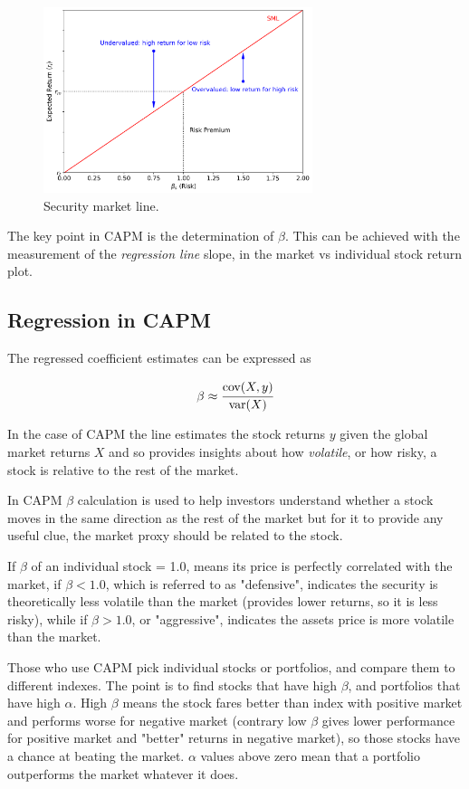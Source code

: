 \begin{figure}[htb]
	\centering
	\includegraphics[width=0.7\textwidth]{figures/sml}
	\caption{Security market line.}
	\label{fig:sml}
\end{figure}

The key point in CAPM is the determination of $\beta$. This can be achieved with the measurement of the \emph{regression line} slope, in the market vs individual stock return plot.

\subsection{Regression in CAPM}

The regressed coefficient estimates can be expressed as 

\begin{equation}
\beta \approx \cfrac{\textrm{cov}(X,y)}{\textrm {var}(X)}
\end{equation}

In the case of CAPM the line estimates the stock returns $y$ given the global market returns $X$ and so provides insights about how \emph{volatile}, or how risky, a stock is relative to the rest of the market.

In CAPM $\beta$ calculation is used to help investors understand whether a stock moves in the same direction as the rest of the market but for it to provide any useful clue, the market proxy should be related to the stock.

If $\beta$ of an individual stock = 1.0, means its price is perfectly correlated with the market, if $\beta < 1.0$, which is referred to as "defensive", indicates the security is theoretically less volatile than the market (provides lower returns, so it is less risky), while if $\beta > 1.0$, or "aggressive", indicates the assets price is more volatile than the market.

Those who use CAPM pick individual stocks or portfolios, and compare them to different indexes. The point is to find stocks that have high $\beta$, and portfolios that have high $\alpha$. High $\beta$ means the stock fares better than index with positive market and performs worse for negative market (contrary low $\beta$ gives lower performance for positive market and "better" returns in negative market), so those stocks have a chance at beating the market. $\alpha$ values above zero mean that a portfolio outperforms the market whatever it does.

